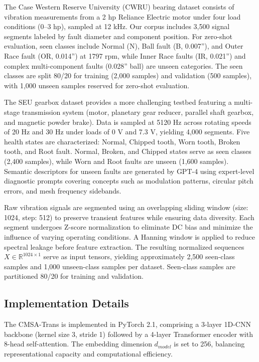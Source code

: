 \documentclass[journal]{IEEEtran}
\begin{document}
The Case Western Reserve University (CWRU) bearing dataset consists of vibration measurements from a 2 hp Reliance Electric motor under four load conditions (0--3 hp), sampled at 12 kHz. Our corpus includes 3,500 signal segments labeled by fault diameter and component position. For zero-shot evaluation, seen classes include Normal (N), Ball fault (B, 0.007''), and Outer Race fault (OR, 0.014'') at 1797 rpm, while Inner Race faults (IR, 0.021'') and complex multi-component faults (0.028'' ball) are unseen categories. The seen classes are split 80/20 for training (2,000 samples) and validation (500 samples), with 1,000 unseen samples reserved for zero-shot evaluation.

The SEU gearbox dataset provides a more challenging testbed featuring a multi-stage transmission system (motor, planetary gear reducer, parallel shaft gearbox, and magnetic powder brake). Data is sampled at 5120 Hz across rotating speeds of 20 Hz and 30 Hz under loads of 0 V and 7.3 V, yielding 4,000 segments. Five health states are characterized: Normal, Chipped tooth, Worn tooth, Broken tooth, and Root fault. Normal, Broken, and Chipped states serve as seen classes (2,400 samples), while Worn and Root faults are unseen (1,600 samples). Semantic descriptors for unseen faults are generated by GPT-4 using expert-level diagnostic prompts covering concepts such as modulation patterns, circular pitch errors, and mesh frequency sidebands.

Raw vibration signals are segmented using an overlapping sliding window (size: 1024, step: 512) to preserve transient features while ensuring data diversity. Each segment undergoes Z-score normalization to eliminate DC bias and minimize the influence of varying operating conditions. A Hanning window is applied to reduce spectral leakage before feature extraction. The resulting normalized sequences $X \in \mathbb{R}^{1024 \times 1}$ serve as input tensors, yielding approximately 2,500 seen-class samples and 1,000 unseen-class samples per dataset. Seen-class samples are partitioned 80/20 for training and validation.

\subsection{Implementation Details}
The CMSA-Trans is implemented in PyTorch 2.1, comprising a 3-layer 1D-CNN backbone (kernel size 3, stride 1) followed by a 4-layer Transformer encoder with 8-head self-attention. The embedding dimension $d_{model}$ is set to 256, balancing representational capacity and computational efficiency.
\end{document}
